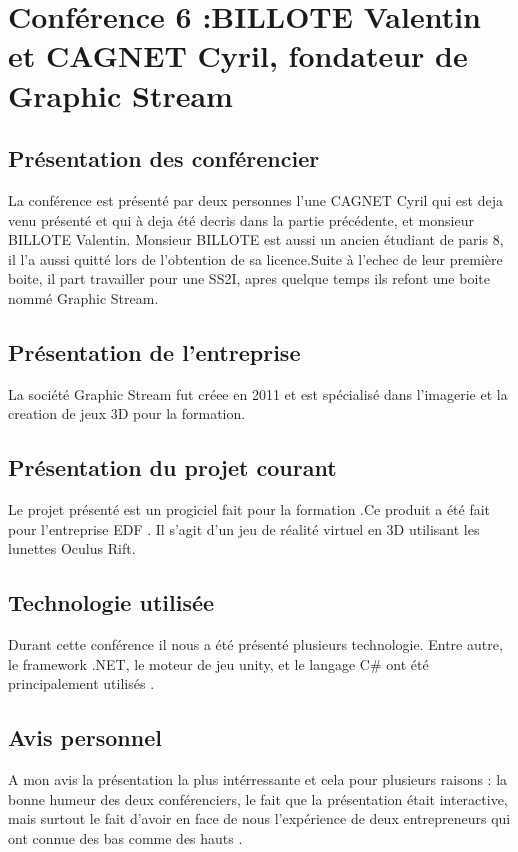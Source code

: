 \section{Conférence 6 :BILLOTE Valentin et CAGNET Cyril, fondateur de Graphic Stream}
 	\subsection{Présentation des conférencier}
 	La conférence est présenté par deux personnes l'une CAGNET Cyril qui est deja venu présenté et qui à deja été decris dans la partie précédente, et monsieur BILLOTE Valentin. Monsieur BILLOTE est aussi un ancien étudiant de paris 8, il l'a aussi quitté lors de l'obtention de sa licence.Suite à l'echec de leur première boite, il part travailler pour une SS2I, apres quelque temps ils refont une boite nommé Graphic Stream.
 	\subsection{Présentation de l'entreprise}
 	 La société Graphic Stream fut créee en 2011 et est spécialisé dans l'imagerie et la creation de jeux 3D pour la formation.
	\subsection{Présentation du projet courant}
	Le projet présenté est un progiciel fait pour la formation .Ce produit a été fait pour l'entreprise EDF . Il s'agit d'un jeu de réalité virtuel en 3D utilisant les lunettes Oculus Rift.
	\subsection{Technologie utilisée}
	Durant cette conférence il nous a été présenté plusieurs technologie. Entre autre, le framework .NET, le moteur de jeu unity, et le langage C\# ont été principalement utilisés . 
  	\subsection{Avis personnel} 
  	A mon avis la présentation la plus intérressante et cela pour plusieurs raisons : la bonne humeur des deux conférenciers, le fait que la présentation était interactive, mais surtout le fait d'avoir en face de nous l'expérience de deux entrepreneurs qui ont connue des bas comme des hauts .
